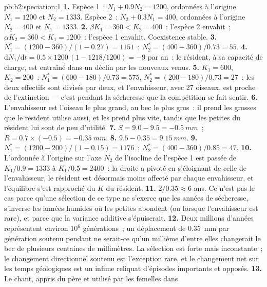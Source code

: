 \begin{solution}{pb:b2:speciation:1}
\textbf{1.} Espèce 1~: $N_1 + 0.9N_2 = 1200$, ordonnées à l'origine $N_1 = 1200$
et $N_2 = 1333$. Espèce 2~: $N_2 + 0.3N_1 = 400$, ordonnées à l'origine $N_2 =
400$ et $N_1 = 1333$.
\textbf{2.} $\beta K_1 = 360 < K_2 = 400$~: l'espèce 2 envahit~;
$\alpha K_2 = 360 < K_1 = 1200$~: l'espèce 1 envahit. Coexistence
stable.
\textbf{3.} $N_1^{*} = (1200 - 360)/(1 - 0.27) = 1151$~; $N_2^{*} =
(400 - 360)/0.73 = 55$.
\textbf{4.} $\mathrm{d}N_1/\mathrm{d}t = 0.5\times 1200\,(1 - 1218/1200)
= -9$ par an~: le résident, à sa capacité de charge, est entraîné dans
un déclin par les nouveaux venus.
\textbf{5.} $K_1 = 600$, $K_2 = 200$~: $N_1^{*} = (600 - 180)/0.73 =
575$, $N_2^{*} = (200 - 180)/0.73 = 27$~: les deux effectifs sont divisés
par deux, et l'envahisseur, avec 27 oiseaux, est proche de l'extinction
--- c'est pendant la sécheresse que la compétition se fait sentir.
\textbf{6.} L'envahisseur est l'oiseau le plus grand, au bec le plus
gros~: il prend les grosses  que le résident utilise aussi, et
les prend plus vite, tandis que les petites  du résident lui sont
de peu d'utilité.
\textbf{7.} $S = 9.0 - 9.5 = \qty{-0.5}{mm}$~; $R = 0.7\times(-0.5) =
\qty{-0.35}{mm}$.
\textbf{8.} $9.5 - 0.35 = \qty{9.15}{mm}$.
\textbf{9.} $N_1^{*} = (1200 - 200)/(1 - 0.15) = 1176$~; $N_2^{*} =
(400 - 360)/0.85 = 47$.
\textbf{10.} L'ordonnée à l'origine sur l'axe $N_2$ de l'isocline de
l'espèce 1 est passée de
$K_1/0.9 = 1333$ à $K_1/0.5 = 2400$~: la droite a pivoté en s'éloignant
de celle de l'envahisseur, le résident est désormais moins affecté par
chaque envahisseur, et l'équilibre s'est rapproché du $K$ du résident.
\textbf{11.} $2/0.35 \approx 6$ ans. Ce n'est pas le cas parce qu'une
sélection de ce type ne s'exerce que les années de sécheresse, s'inverse
les années humides où les petites  abondent (ou lorsque
l'envahisseur est rare), et parce que la variance additive s'épuiserait.
\textbf{12.} Deux millions d'années représentent environ $10^{6}$
générations~; un déplacement de \qty{0.35}{mm} par génération soutenu
pendant ne serait-ce qu'un millième d'entre elles changerait le bec de
plusieurs centaines de millimètres. La sélection est forte mais
inconstante~; le changement directionnel soutenu est l'exception rare, et
le changement net sur les temps géologiques est un infime reliquat
d'épisodes importants et opposés.
\textbf{13.} Le chant, appris du père et utilisé par les femelles dans

\end{solution}
